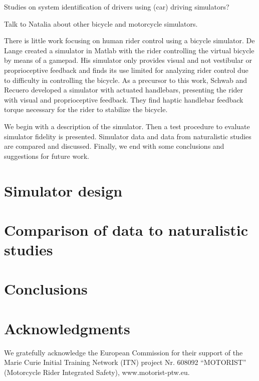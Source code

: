 \documentclass[11pt,a4paper]{amsart}
\begin{document}
Studies on system identification of drivers using (car) driving simulators?

Talk to Natalia about other bicycle and motorcycle simulators.

There is little work focusing on human rider control using a bicycle simulator.
De Lange created a simulator in Matlab with the rider controlling the virtual bicycle by means of a
gamepad\cite{delange2011}.
His simulator only provides visual and not vestibular or proprioceptive feedback and finds its use limited for
analyzing rider control due to difficulty in controlling the bicycle.
As a precursor to this work, Schwab and Recuero developed a simulator with actuated handlebars\cite{schwab2013},
presenting the rider with visual and proprioceptive feedback.
They find haptic handlebar feedback torque necessary for the rider to stabilize the bicycle.

We begin with a description of the simulator.
Then a test procedure to evaluate simulator fidelity is presented.
Simulator data and data from naturalistic studies are compared and discussed.
Finally, we end with some conclusions and suggestions for future work.

\section{Simulator design}

\section{Comparison of data to naturalistic studies}

\section{Conclusions}

\section{Acknowledgments}
We gratefully acknowledge the European Commission for their support of the Marie Curie Initial Training Network (ITN)
project Nr. 608092 “MOTORIST” (Motorcycle Rider Integrated Safety), www.motorist-ptw.eu.

\nocite{meijaard2007}


\end{document}
